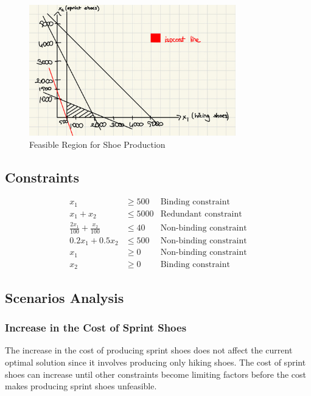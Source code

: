 \documentclass[12pt]{article}
\begin{document}
\begin{figure}[h!]
    \centering
    \includegraphics[width=0.8\textwidth]{urban-3-dijital-2-1 2-2.jpeg}
    \caption{Feasible Region for Shoe Production}
\end{figure}

\subsection*{Constraints}
\begin{align*}
    x_1 &\geq 500 &\text{Binding constraint} \\
    x_1 + x_2 &\leq 5000 &\text{Redundant constraint} \\
    \frac{2x_1}{100} + \frac{x_2}{100} &\leq 40 &\text{Non-binding constraint} \\
    0.2x_1 + 0.5x_2 &\leq 500 &\text{Non-binding constraint} \\
    x_1&\geq 0 &\text{Non-binding constraint} \\
    x_2 &\geq 0 &\text{Binding constraint} 
\end{align*}

\subsection*{Scenarios Analysis}

\subsubsection*{Increase in the Cost of Sprint Shoes}

The increase in the cost of producing sprint shoes does not affect the current optimal solution since it involves producing only hiking shoes. The cost of sprint shoes can increase until other constraints become limiting factors before the cost makes producing sprint shoes unfeasible.
\end{document}
